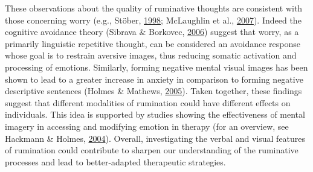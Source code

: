 \documentclass[a4paper,12pt,twoside,openright,oldfontcommands]{memoir}
\begin{document}
These observations about the quality of ruminative thoughts are consistent with those concerning worry (e.g., Stöber, \protect\hyperlink{ref-stober_worry_1998}{1998}; McLaughlin et al., \protect\hyperlink{ref-mclaughlin_effects_2007}{2007}). Indeed the cognitive avoidance theory (Sibrava \& Borkovec, \protect\hyperlink{ref-davey_cognitive_2006}{2006}) suggest that worry, as a primarily linguistic repetitive thought, can be considered an avoidance response whose goal is to restrain aversive images, thus reducing somatic activation and processing of emotions. Similarly, forming negative mental visual images has been shown to lead to a greater increase in anxiety in comparison to forming negative descriptive sentences (Holmes \& Mathews, \protect\hyperlink{ref-holmes_mental_2005}{2005}). Taken together, these findings suggest that different modalities of rumination could have different effects on individuals. This idea is supported by studies showing the effectiveness of mental imagery in accessing and modifying emotion in therapy (for an overview, see Hackmann \& Holmes, \protect\hyperlink{ref-hackmann_reflecting_2004}{2004}). Overall, investigating the verbal and visual features of rumination could contribute to sharpen our understanding of the ruminative processes and lead to better-adapted therapeutic strategies.
\end{document}

